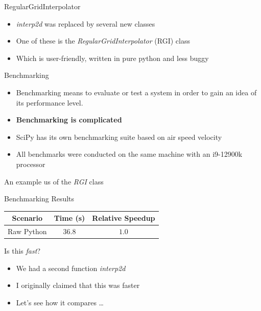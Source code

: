 \documentclass[12pt,xcolor=dvipsnames]{beamer}
\begin{document}
    \begin{frame}{RegularGridInterpolator}
        \begin{itemize}
            \item \textit{interp2d} was replaced by several new classes
            \item One of these is the \textit{RegularGridInterpolator} (RGI) class
            \item Which is user-friendly, written in pure python and less buggy
        \end{itemize}
    \end{frame}

    \begin{frame}{Benchmarking}
        \begin{itemize}
            \item Benchmarking means to evaluate or test a system in order to gain an idea of its performance level.
            \item \textbf{Benchmarking is complicated}
            \item SciPy has its own benchmarking suite based on air speed velocity
            \item All benchmarks were conducted on the same machine with an i9-12900k processor
        \end{itemize}
    \end{frame}

    \begin{frame}{An example us of the \textit{RGI} class}
        
    \end{frame}

    \begin{frame}{Benchmarking Results}
        \begin{center}
        \begin{tabular}{ | c | c | c | }
            \hline
            Scenario & Time (s) & Relative Speedup \\
            \hline
            Raw Python & $36.8$ & $1.0$ \\
            \hline
        \end{tabular}
        \end{center}
    \end{frame}

    \begin{frame}{Is this \textit{fast}?}
        \begin{itemize}
            \item We had a second function \textit{interp2d}
            \item I originally claimed that this was faster
            \item Let's see how it compares \ldots
        \end{itemize}
    \end{frame}
\end{document}

